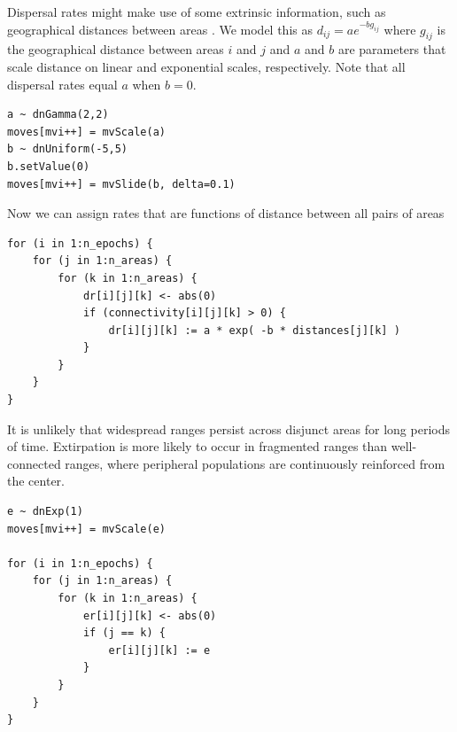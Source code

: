 
Dispersal rates might make use of some extrinsic information, such as geographical distances between areas \citep{macarthur67, webb12}.
We model this as $d_{ij} = a e ^ {-b g_{ij}}$ where $g_{ij}$ is the geographical distance between areas $i$ and $j$ and $a$ and $b$ are parameters that scale distance on linear and exponential scales, respectively. Note that all dispersal rates equal $a$ when $b=0$.

\begin{snugshade}
\begin{lstlisting}
a ~ dnGamma(2,2)
moves[mvi++] = mvScale(a)
b ~ dnUniform(-5,5)
b.setValue(0)
moves[mvi++] = mvSlide(b, delta=0.1)
\end{lstlisting}
\end{snugshade}

Now we can assign rates that are functions of distance between all pairs of areas

\begin{snugshade}
\begin{lstlisting}
for (i in 1:n_epochs) {
    for (j in 1:n_areas) {
        for (k in 1:n_areas) {
            dr[i][j][k] <- abs(0)
            if (connectivity[i][j][k] > 0) {
                dr[i][j][k] := a * exp( -b * distances[j][k] )
            }
        }
    }
}
\end{lstlisting}
\end{snugshade}



It is unlikely that widespread ranges persist across disjunct areas for long periods of time.
Extirpation is more likely to occur in fragmented ranges than well-connected ranges, where peripheral populations are continuously reinforced from the center.

\begin{snugshade}
\begin{lstlisting}
e ~ dnExp(1)
moves[mvi++] = mvScale(e)

for (i in 1:n_epochs) {
    for (j in 1:n_areas) {
        for (k in 1:n_areas) {
            er[i][j][k] <- abs(0)
            if (j == k) {
                er[i][j][k] := e
            }
        }
    }
}

\end{lstlisting}
\end{snugshade}


